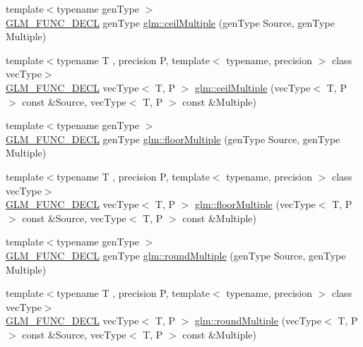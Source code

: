 \begin{DoxyCompactItemize}
\item 
{\footnotesize template$<$typename gen\+Type $>$ }\\\mbox{\hyperlink{setup_8hpp_ab2d052de21a70539923e9bcbf6e83a51}{G\+L\+M\+\_\+\+F\+U\+N\+C\+\_\+\+D\+E\+CL}} gen\+Type \mbox{\hyperlink{group__gtc__round_gac84898c466e609cdd2e81d9ba907d9e8}{glm\+::ceil\+Multiple}} (gen\+Type Source, gen\+Type Multiple)
\item 
{\footnotesize template$<$typename T , precision P, template$<$ typename, precision $>$ class vec\+Type$>$ }\\\mbox{\hyperlink{setup_8hpp_ab2d052de21a70539923e9bcbf6e83a51}{G\+L\+M\+\_\+\+F\+U\+N\+C\+\_\+\+D\+E\+CL}} vec\+Type$<$ T, P $>$ \mbox{\hyperlink{group__gtc__round_gafe632af669ac57d670ca18e3665a12ca}{glm\+::ceil\+Multiple}} (vec\+Type$<$ T, P $>$ const \&Source, vec\+Type$<$ T, P $>$ const \&Multiple)
\item 
{\footnotesize template$<$typename gen\+Type $>$ }\\\mbox{\hyperlink{setup_8hpp_ab2d052de21a70539923e9bcbf6e83a51}{G\+L\+M\+\_\+\+F\+U\+N\+C\+\_\+\+D\+E\+CL}} gen\+Type \mbox{\hyperlink{group__gtc__round_ga9eafb9dbedf84e5cece65c2fe9d5631d}{glm\+::floor\+Multiple}} (gen\+Type Source, gen\+Type Multiple)
\item 
{\footnotesize template$<$typename T , precision P, template$<$ typename, precision $>$ class vec\+Type$>$ }\\\mbox{\hyperlink{setup_8hpp_ab2d052de21a70539923e9bcbf6e83a51}{G\+L\+M\+\_\+\+F\+U\+N\+C\+\_\+\+D\+E\+CL}} vec\+Type$<$ T, P $>$ \mbox{\hyperlink{group__gtc__round_ga6912db42d43873fe1dedb3aed2b7a239}{glm\+::floor\+Multiple}} (vec\+Type$<$ T, P $>$ const \&Source, vec\+Type$<$ T, P $>$ const \&Multiple)
\item 
{\footnotesize template$<$typename gen\+Type $>$ }\\\mbox{\hyperlink{setup_8hpp_ab2d052de21a70539923e9bcbf6e83a51}{G\+L\+M\+\_\+\+F\+U\+N\+C\+\_\+\+D\+E\+CL}} gen\+Type \mbox{\hyperlink{group__gtc__round_ga6739d1de04b2cea7c78675b365644bce}{glm\+::round\+Multiple}} (gen\+Type Source, gen\+Type Multiple)
\item 
{\footnotesize template$<$typename T , precision P, template$<$ typename, precision $>$ class vec\+Type$>$ }\\\mbox{\hyperlink{setup_8hpp_ab2d052de21a70539923e9bcbf6e83a51}{G\+L\+M\+\_\+\+F\+U\+N\+C\+\_\+\+D\+E\+CL}} vec\+Type$<$ T, P $>$ \mbox{\hyperlink{group__gtc__round_ga10a8ab7b254257b607b6a3fc68c3e661}{glm\+::round\+Multiple}} (vec\+Type$<$ T, P $>$ const \&Source, vec\+Type$<$ T, P $>$ const \&Multiple)
\end{DoxyCompactItemize}


